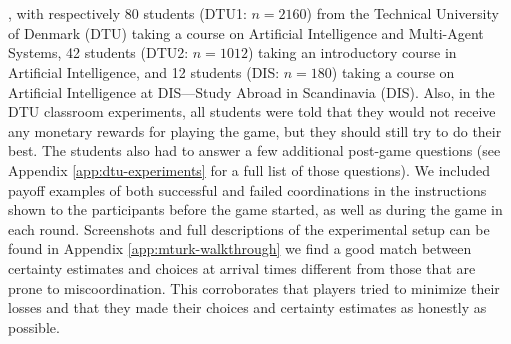 \section{}\label{sect:experimental_design} 
, with respectively 80 students (DTU1: $n=2160$) from the Technical University of Denmark (DTU) taking a course on Artificial Intelligence and Multi-Agent Systems, 42 students (DTU2: $n=1012$) taking an introductory course in Artificial Intelligence, and 12 students (DIS: $n=180$) taking a course on Artificial Intelligence at DIS---Study Abroad in Scandinavia (DIS).  Also, in the DTU classroom experiments, all students were told that they would not receive any monetary rewards for playing the game, but they should still try to do their best.  The students also had to answer a few additional post-game questions (see  Appendix \ref{app:dtu-experiments} for a full list of those questions). We included payoff examples of both successful and failed coordinations in the instructions shown to the participants before the game started, as well as during the game in each round. Screenshots and full descriptions of the experimental setup can be found in Appendix \ref{app:mturk-walkthrough} we find a good match between certainty estimates and choices at arrival times different from those that are prone to miscoordination. This corroborates that players tried to minimize their losses and that they made their choices and certainty estimates as honestly as possible. 

